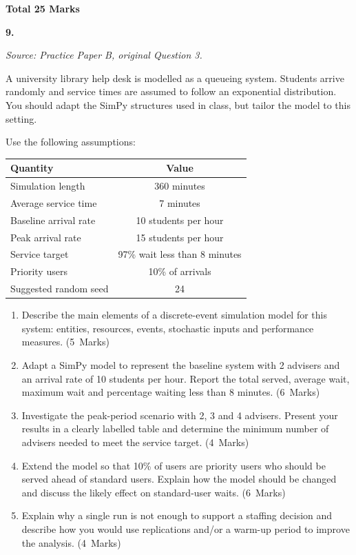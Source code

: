 \documentclass[11pt,a4paper]{article}
\newcommand{\markalloc}[1]{\nobreak\hfill\mbox{(#1 Marks)}}
\newcommand{\questiontotal}[1]{\begin{flushright}\textbf{Total #1 Marks}\end{flushright}}
\begin{document}
\questiontotal{25}

\newpage

\textbf{9.}

\textit{Source: Practice Paper B, original Question 3.}



A university library help desk is modelled as a queueing system.
Students arrive randomly and service times are assumed to follow an exponential distribution.
You should adapt the SimPy structures used in class, but tailor the model to this setting.

Use the following assumptions:

\begin{center}
\begin{tabular}{lc}
\toprule
Quantity & Value \\
\midrule
Simulation length & 360 minutes \\
Average service time & 7 minutes \\
Baseline arrival rate & 10 students per hour \\
Peak arrival rate & 15 students per hour \\
Service target & 97\% wait less than 8 minutes \\
Priority users & 10\% of arrivals \\
Suggested random seed & 24 \\
\bottomrule
\end{tabular}
\end{center}

\begin{enumerate}
\item Describe the main elements of a discrete-event simulation model for this system: entities, resources, events, stochastic inputs and performance measures. \markalloc{5}

\item Adapt a SimPy model to represent the baseline system with 2 advisers and an arrival rate of 10 students per hour. Report the total served, average wait, maximum wait and percentage waiting less than 8 minutes. \markalloc{6}

\item Investigate the peak-period scenario with 2, 3 and 4 advisers. Present your results in a clearly labelled table and determine the minimum number of advisers needed to meet the service target. \markalloc{4}

\item Extend the model so that 10\% of users are priority users who should be served ahead of standard users. Explain how the model should be changed and discuss the likely effect on standard-user waits. \markalloc{6}

\item Explain why a single run is not enough to support a staffing decision and describe how you would use replications and/or a warm-up period to improve the analysis. \markalloc{4}
\end{enumerate}
\end{document}
